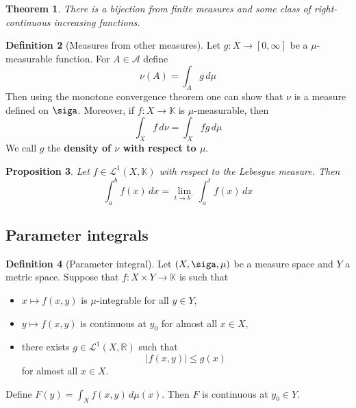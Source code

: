 \documentclass[10pt, oneside, reqno]{amsart}
\theoremstyle{plain}%
\newtheorem{thm}{Theorem}[section]
\newtheorem{prop}[thm]{Proposition}
\theoremstyle{definition}
\newtheorem{defn}[thm]{Definition}
\theoremstyle{remark}
\newcommand{\R}{\mathbb{R}}
\newcommand{\dmu}{\, d \mu}
\begin{document}
\begin{thm}
    There is a bijection from finite measures and some class of right-continuous increasing functions.
\end{thm}

\begin{defn}[Measures from other measures]
    Let $g: X \rightarrow [0,\infty]$ be a $\mu$-measurable function.  For $A \in \mathcal{A}$ define \[
        \nu(A) = \int_A g \dmu
    \]  
Then using the monotone convergence theorem one can show that $\nu$ is a measure defined on $\siga$.  Moreover, if $f: X \rightarrow \mathbb{K}$ is $\mu$-measurable, then \[
    \int_X f \, d \nu = \int_X fg \dmu
\]
We call $g$ the \textbf{density of $\nu$ with respect to $\mu$}.
\end{defn}

\begin{prop}
    Let $f \in  \mathcal{L}^1(X,\mathbb{K})$ with respect to the Lebesgue measure.  Then \[
        \int_a^b f(x) \, dx = \lim_{t \rightarrow b^-} \int_a^t f(x) \, dx
    \]
\end{prop}

\subsection{Parameter integrals} %
\label{sub:parameter_integrals}
\newcommand{\ellone}[1]{\mathcal{L}^1(X,#1)}
\begin{defn}[Parameter integral]
    Let $(X, \siga, \mu)$ be a measure space and $Y$ a metric space.  Suppose that $f : X \times Y \rightarrow \mathbb{K}$ is such that 
     \begin{itemize}
        \item $x \mapsto f(x,y)$ is $\mu$-integrable for all $y \in Y$,
        \item $y \mapsto f(x,y)$ is continuous at $y_0$ for almost all $x \in X$,
        \item there exists $g \in \ellone{\R}$ such that \[
            |f(x,y)| \leq g(x)
        \] for almost all $x \in X$.  

     \end{itemize}
        Define $F(y) = \int_X f(x,y) \dmu(x)$.  Then $F$ is continuous at $y_0 \in Y$.
    
\end{defn}
\end{document}
